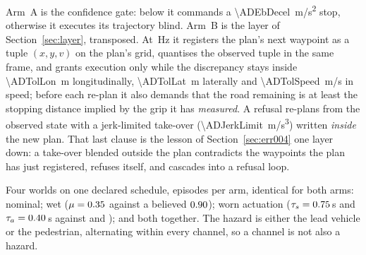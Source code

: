 \documentclass[conference]{IEEEtran}
\theoremstyle{definition}
\begin{document}
Arm~A is the confidence gate: below \ADConfThreshold{} it commands a
\SI{\ADEbDecel}{m/s^2} stop, otherwise it executes its trajectory blind.
Arm~B is the layer of Section~\ref{sec:layer}, transposed. At \ADWitnessHz\,Hz
it registers the plan's next waypoint as a tuple $(x,y,v)$ on the plan's grid,
quantises the observed tuple in the same frame, and grants execution only while
the discrepancy stays inside \SI{\ADTolLon}{m} longitudinally,
\SI{\ADTolLat}{m} laterally and \SI{\ADTolSpeed}{m/s} in speed; before each
re-plan it also demands that the road remaining is at least the stopping
distance implied by the grip it has \emph{measured}. A refusal re-plans from the
observed state with a jerk-limited take-over (\SI{\ADJerkLimit}{m/s^3}) written
\emph{inside} the new plan. That last clause is the lesson of
Section~\ref{sec:err004} one layer down: a take-over blended outside the plan
contradicts the waypoints the plan has just registered, refuses itself, and
cascades into a refusal loop.

Four worlds on one declared schedule, \ADEpisodesPerArm{} episodes per arm,
identical for both arms: nominal; wet ($\mu=0.35$ against a believed
$0.90$); worn actuation ($\tau_s=0.75$\,s and
$\tau_a=0.40$\,s against \ADTauSNominal{} and \ADTauANominal{}); and both
together. The hazard is either the lead vehicle or the pedestrian, alternating
within every channel, so a channel is not also a hazard.


\end{document}
